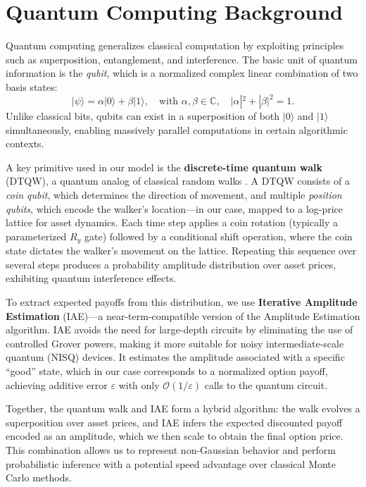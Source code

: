 \documentclass[11pt]{article}
\begin{document}
\section{Quantum Computing Background}

Quantum computing generalizes classical computation by exploiting principles such as superposition, entanglement, and interference. The basic unit of quantum information is the \emph{qubit}, which is a normalized complex linear combination of two basis states:
\begin{equation}
|\psi\rangle = \alpha |0\rangle + \beta |1\rangle, \quad \text{with } \alpha, \beta \in \mathbb{C}, \quad |\alpha|^2 + |\beta|^2 = 1.
\end{equation}
Unlike classical bits, qubits can exist in a superposition of both $|0\rangle$ and $|1\rangle$ simultaneously, enabling massively parallel computations in certain algorithmic contexts.

A key primitive used in our model is the \textbf{discrete-time quantum walk} (DTQW), a quantum analog of classical random walks \cite{venegas2012quantum}. A DTQW consists of a \emph{coin qubit}, which determines the direction of movement, and multiple \emph{position qubits}, which encode the walker's location—in our case, mapped to a log-price lattice for asset dynamics. Each time step applies a coin rotation (typically a parameterized $R_y$ gate) followed by a conditional shift operation, where the coin state dictates the walker’s movement on the lattice. Repeating this sequence over several steps produces a probability amplitude distribution over asset prices, exhibiting quantum interference effects.

To extract expected payoffs from this distribution, we use \textbf{Iterative Amplitude Estimation} (IAE)—a near-term-compatible version of the Amplitude Estimation algorithm. IAE avoids the need for large-depth circuits by eliminating the use of controlled Grover powers, making it more suitable for noisy intermediate-scale quantum (NISQ) devices. It estimates the amplitude associated with a specific “good” state, which in our case corresponds to a normalized option payoff, achieving additive error $\varepsilon$ with only $\mathcal{O}(1/\varepsilon)$ calls \cite{grinko2019iterative} to the quantum circuit.

Together, the quantum walk and IAE form a hybrid algorithm: the walk evolves a superposition over asset prices, and IAE infers the expected discounted payoff encoded as an amplitude, which we then scale to obtain the final option price. This combination allows us to represent non-Gaussian behavior and perform probabilistic inference with a potential speed advantage over classical Monte Carlo methods.
\end{document}
